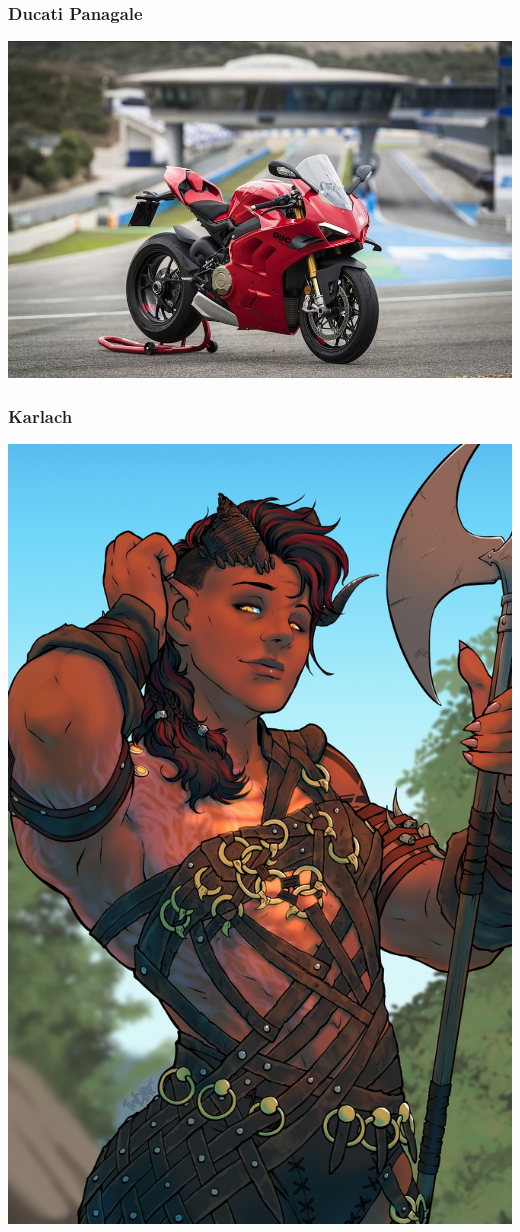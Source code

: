 \documentclass{beamer}
\begin{document}
\begin{frame}
	\frametitle{Ducati Panagale}
	\includegraphics[scale=0.3]{panagale1.png}
\end{frame}

\begin{frame}
	\frametitle{Karlach}
	\includegraphics[scale=0.05]{karlach.jpeg}
\end{frame}
\end{document}
